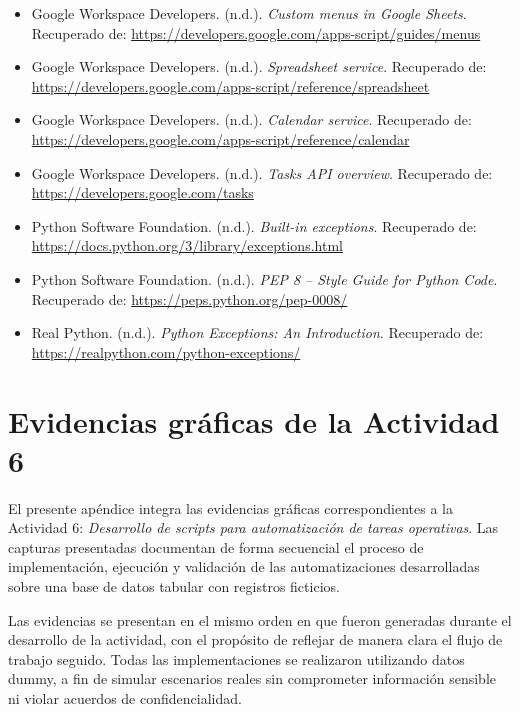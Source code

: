 \documentclass[12pt]{article}
\begin{document}
\begin{itemize}
    \item Google Workspace Developers. (n.d.). \textit{Custom menus in Google Sheets}.  
    Recuperado de: \url{https://developers.google.com/apps-script/guides/menus}

    \item Google Workspace Developers. (n.d.). \textit{Spreadsheet service}.  
    Recuperado de: \url{https://developers.google.com/apps-script/reference/spreadsheet}

    \item Google Workspace Developers. (n.d.). \textit{Calendar service}.  
    Recuperado de: \url{https://developers.google.com/apps-script/reference/calendar}

    \item Google Workspace Developers. (n.d.). \textit{Tasks API overview}.  
    Recuperado de: \url{https://developers.google.com/tasks}

    \item Python Software Foundation. (n.d.). \textit{Built-in exceptions}.  
    Recuperado de: \url{https://docs.python.org/3/library/exceptions.html}

    \item Python Software Foundation. (n.d.). \textit{PEP 8 -- Style Guide for Python Code}.  
    Recuperado de: \url{https://peps.python.org/pep-0008/}

    \item Real Python. (n.d.). \textit{Python Exceptions: An Introduction}.  
    Recuperado de: \url{https://realpython.com/python-exceptions/}
\end{itemize}

\appendix
\section{Evidencias gráficas de la Actividad 6}

El presente apéndice integra las evidencias gráficas correspondientes a la Actividad 6: 
\textit{Desarrollo de scripts para automatización de tareas operativas}. Las capturas presentadas documentan de forma secuencial el proceso de implementación, ejecución y validación de las automatizaciones desarrolladas sobre una base de datos tabular con registros ficticios.

Las evidencias se presentan en el mismo orden en que fueron generadas durante el desarrollo de la actividad, con el propósito de reflejar de manera clara el flujo de trabajo seguido. Todas las implementaciones se realizaron utilizando datos dummy, a fin de simular escenarios reales sin comprometer información sensible ni violar acuerdos de confidencialidad.
\end{document}
